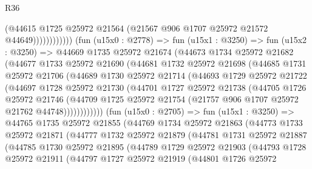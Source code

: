 \begin{lexlean}{R36}
\begin{coremodule}
                            (@44615
                              @1725
                              @25972
                              @21564
                              (@21567 @906 @1707 @25972 @21572 @44649))))))))))))
        (fun (u15x0 : @2778) =>
        fun (u15x1 : @3250) =>
        fun (u15x2 : @3250) =>
        @44669
          @1735
          @25972
          @21674
          (@44673
            @1734
            @25972
            @21682
            (@44677
              @1733
              @25972
              @21690
              (@44681
                @1732
                @25972
                @21698
                (@44685
                  @1731
                  @25972
                  @21706
                  (@44689
                    @1730
                    @25972
                    @21714
                    (@44693
                      @1729
                      @25972
                      @21722
                      (@44697
                        @1728
                        @25972
                        @21730
                        (@44701
                          @1727
                          @25972
                          @21738
                          (@44705
                            @1726
                            @25972
                            @21746
                            (@44709
                              @1725
                              @25972
                              @21754
                              (@21757 @906 @1707 @25972 @21762 @44748))))))))))))
        (fun (u15x0 : @2705) =>
        fun (u15x1 : @3250) =>
        @44765
          @1735
          @25972
          @21855
          (@44769
            @1734
            @25972
            @21863
            (@44773
              @1733
              @25972
              @21871
              (@44777
                @1732
                @25972
                @21879
                (@44781
                  @1731
                  @25972
                  @21887
                  (@44785
                    @1730
                    @25972
                    @21895
                    (@44789
                      @1729
                      @25972
                      @21903
                      (@44793
                        @1728
                        @25972
                        @21911
                        (@44797
                          @1727
                          @25972
                          @21919
                          (@44801
                            @1726
                            @25972

\end{coremodule}
\end{lexlean}
